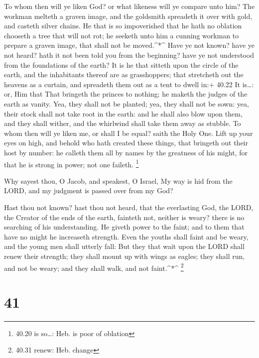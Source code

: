  To whom then will ye liken God? or what likeness will ye
compare unto him?  The workman melteth a graven image, and
the goldsmith spreadeth it over with gold, and casteth silver chains.
 He that is so impoverished that he hath no oblation
chooseth a tree that will not rot; he seeketh unto him a cunning workman
to prepare a graven image, that shall not be moved.\^{}*\^{}
 Have ye not known? have ye not heard? hath it not been
told you from the beginning? have ye not understood from the foundations
of the earth?  It is he that sitteth upon the circle of the
earth, and the inhabitants thereof are as grasshoppers; that stretcheth
out the heavens as a curtain, and spreadeth them out as a tent to dwell
in:+ 40.22 It is\ldots: or, Him that  That bringeth the
princes to nothing; he maketh the judges of the earth as vanity.
 Yea, they shall not be planted; yea, they shall not be
sown: yea, their stock shall not take root in the earth: and he shall
also blow upon them, and they shall wither, and the whirlwind shall take
them away as stubble.  To whom then will ye liken me, or
shall I be equal? saith the Holy One.  Lift up your eyes on
high, and behold who hath created these things, that bringeth out their
host by number: he calleth them all by names by the greatness of his
might, for that he is strong in power; not one faileth. \footnote{40.20
  is so\ldots: Heb. is poor of oblation}

 Why sayest thou, O Jacob, and speakest, O Israel, My way
is hid from the LORD, and my judgment is passed over from my God?

 Hast thou not known? hast thou not heard, that the
everlasting God, the LORD, the Creator of the ends of the earth,
fainteth not, neither is weary? there is no searching of his
understanding.  He giveth power to the faint; and to them
that have no might he increaseth strength.  Even the youths
shall faint and be weary, and the young men shall utterly fall:
 But they that wait upon the LORD shall renew their
strength; they shall mount up with wings as eagles; they shall run, and
not be weary; and they shall walk, and not faint.\^{}*\^{} \footnote{40.31
  renew: Heb. change}

\hypertarget{section-40}{%
\section{41}\label{section-40}}

